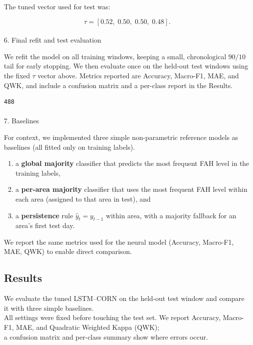 \documentclass[
  letterpaper,
  DIV=11,
  numbers=noendperiod]{scrartcl}
\makeatletter
\let\oldparagraph\paragraph
\renewcommand{\paragraph}{
    \@ifstar
      \xxxParagraphStar
      \xxxParagraphNoStar
  }
\newcommand{\xxxParagraphStar}[1]{\oldparagraph*{#1}\mbox{}}
\newcommand{\xxxParagraphNoStar}[1]{\oldparagraph{#1}\mbox{}}
\providecommand{\tightlist}{%
  \setlength{\itemsep}{0pt}\setlength{\parskip}{0pt}}\usepackage{longtable,booktabs,array}
\makeatother
\begin{document}
The tuned vector used for test was:

\[
\tau = [0.52, \; 0.50, \; 0.50, \; 0.48].
\]

\paragraph{6. Final refit and test
evaluation}\label{final-refit-and-test-evaluation}

We refit the model on all training windows, keeping a small,
chronological \(90/10\) tail for early stopping. We then evaluate once
on the held-out test windows using the fixed \(\tau\) vector above.
Metrics reported are Accuracy, Macro-F1, MAE, and QWK, and include a
confusion matrix and a per-class report in the Results.

\begin{verbatim}
488
\end{verbatim}

\paragraph{7. Baselines}\label{baselines}

For context, we implemented three simple non-parametric reference models
as baselines (all fitted only on training labels).

\begin{enumerate}
\def\labelenumi{(\roman{enumi})}
\tightlist
\item
  a \textbf{global majority} classifier that predicts the most frequent
  FAH level in the training labels,\\
\item
  a \textbf{per-area majority} classifier that uses the most frequent
  FAH level within each area (assigned to that area in test), and\\
\item
  a \textbf{persistence} rule \(\hat{y}_t = y_{t-1}\) within area, with
  a majority fallback for an area's first test day.
\end{enumerate}

We report the same metrics used for the neural model (Accuracy,
Macro-F1, MAE, QWK) to enable direct comparison.

\subsection{Results}\label{results}

We evaluate the tuned LSTM--CORN on the held-out test window and compare
it with three simple baselines.\\
All settings were fixed before touching the test set. We report
Accuracy, Macro-F1, MAE, and Quadratic Weighted Kappa (QWK);\\
a confusion matrix and per-class summary show where errors occur.
\end{document}
